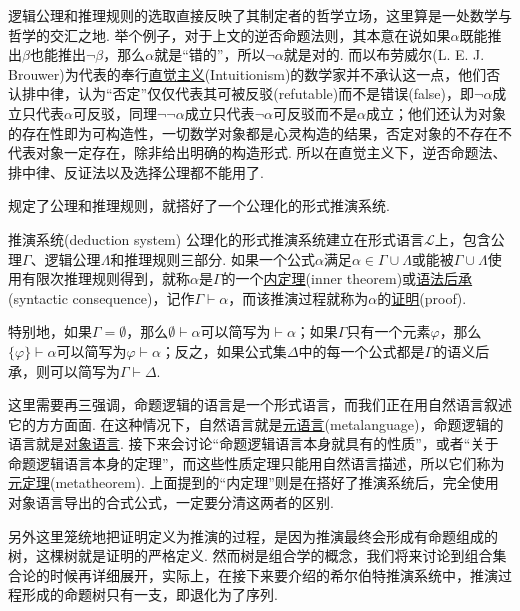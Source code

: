 \begin{note}
    逻辑公理和推理规则的选取直接反映了其制定者的哲学立场，这里算是一处数学与哲学的交汇之地. 举个例子，对于上文的逆否命题法则，其本意在说如果\(\alpha\)既能推出\(\beta\)也能推出\(\neg\beta\)，那么\(\alpha\)就是“错的”，所以\(\neg\alpha\)就是对的. 而以布劳威尔(L. E. J. Brouwer)为代表的奉行\underline{直觉主义}(Intuitionism)的数学家并不承认这一点，他们否认排中律，认为“否定”仅仅代表其可被反驳(refutable)而不是错误(false)，即\(\neg \alpha\)成立只代表\(\alpha\)可反驳，同理\(\neg\neg\alpha\)成立只代表\(\neg\alpha\)可反驳而不是\(\alpha\)成立；他们还认为对象的存在性即为可构造性，一切数学对象都是心灵构造的结果，否定对象的不存在不代表对象一定存在，除非给出明确的构造形式. 所以在直觉主义下，逆否命题法、排中律、反证法以及选择公理都不能用了.
\end{note}

规定了公理和推理规则，就搭好了一个公理化的形式推演系统.

\begin{definition}{推演系统(deduction system)}
    公理化的形式推演系统建立在形式语言\(\mathcal{L}\)上，包含公理\(\Gamma\)、逻辑公理\(\Lambda\)和推理规则三部分. 如果一个公式\(\alpha\)满足\(\alpha \in \Gamma \cup \Lambda\)或能被\(\Gamma \cup \Lambda\)使用有限次推理规则得到，就称\(\alpha\)是\(\Gamma\)的一个\underline{内定理}(inner theorem)或\underline{语法后承}(syntactic consequence)，记作\(\Gamma \vdash \alpha\)，而该推演过程就称为\(\alpha\)的\underline{证明}(proof).
\end{definition}

\begin{reference}
    特别地，如果\(\Gamma=\emptyset\)，那么\(\emptyset \vdash \alpha\)可以简写为\(\vdash \alpha\)；如果\(\Gamma\)只有一个元素\(\varphi\)，那么\(\{\varphi\} \vdash \alpha\)可以简写为\(\varphi \vdash \alpha\)；反之，如果公式集$\Delta$中的每一个公式都是$\Gamma$的语义后承，则可以简写为$\Gamma \vdash \Delta $.
\end{reference}

这里需要再三强调，命题逻辑的语言是一个形式语言，而我们正在用自然语言叙述它的方方面面. 在这种情况下，自然语言就是\underline{元语言}(metalanguage)，命题逻辑的语言就是\underline{对象语言}. 接下来会讨论“命题逻辑语言本身就具有的性质”，或者“关于命题逻辑语言本身的定理”，而这些性质定理只能用自然语言描述，所以它们称为\underline{元定理}(metatheorem). 上面提到的“内定理”则是在搭好了推演系统后，完全使用对象语言导出的合式公式，一定要分清这两者的区别. 

另外这里笼统地把证明定义为推演的过程，是因为推演最终会形成有命题组成的树，这棵树就是证明的严格定义. 然而树是组合学的概念，我们将来讨论到组合集合论的时候再详细展开，实际上，在接下来要介绍的希尔伯特推演系统中，推演过程形成的命题树只有一支，即退化为了序列. 

